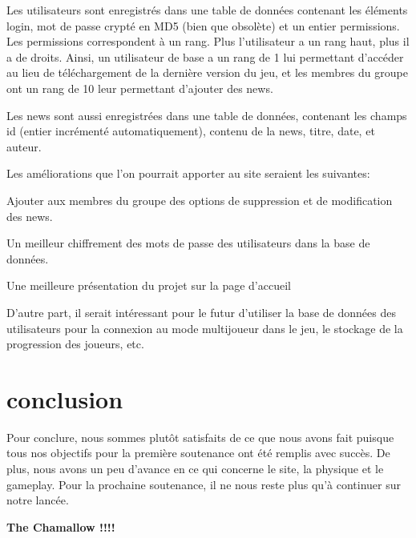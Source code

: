 \documentclass[a4paper]{article}
\begin{document}
Les utilisateurs sont enregistrés dans une table de données contenant les éléments login, mot de passe crypté en MD5 (bien que obsolète) et un entier permissions. Les permissions correspondent à un rang. Plus l’utilisateur a un rang haut, plus il a de droits. Ainsi, un utilisateur de base a un rang de 1 lui permettant d’accéder au lieu de téléchargement de la dernière version du jeu, et les membres du groupe ont un rang de 10 leur permettant d’ajouter des news.

Les news sont aussi enregistrées dans une table de données, contenant les champs id (entier incrémenté automatiquement), contenu de la news, titre, date, et auteur.

Les améliorations que l’on pourrait apporter au site seraient les suivantes:

Ajouter aux membres du groupe des options de suppression et de modification des news.

Un meilleur chiffrement des mots de passe des utilisateurs dans la base de données.

Une meilleure présentation du projet sur la page d’accueil


D’autre part, il serait intéressant pour le futur d’utiliser la base de données des utilisateurs pour la connexion au mode multijoueur dans le jeu, le stockage de la progression des joueurs, etc.

\quad

\newpage

\section{conclusion}

\quad

    Pour conclure, nous sommes plutôt satisfaits de ce que nous avons fait puisque tous nos objectifs pour la première soutenance ont été remplis avec succès. De plus, nous avons un peu d’avance en ce qui concerne le site, la physique et le gameplay. Pour la prochaine soutenance, il ne nous reste plus qu’à continuer sur notre lancée.

\quad

\quad

\begin{center}

\textbf{The Chamallow !!!!}

\end{center}
\end{document}
